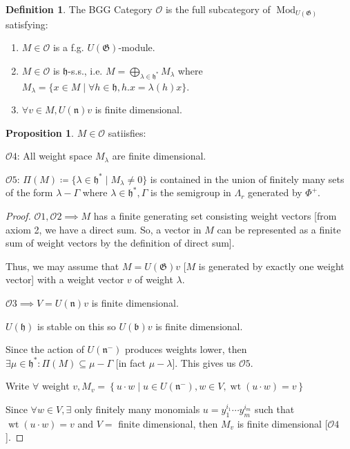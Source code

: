 \documentclass{article}
\theoremstyle{definition}
\newtheorem*{definition}{Definition}
\newtheorem{proposition}[theorem]{Proposition}
\begin{document}
    \begin{definition}
        The BGG Category \(\mathcal{O}\) is the full subcategory of \(\operatorname{Mod}_{U(\mathfrak{G})}\) satisfying:

        \begin{enumerate}[label=$\mathcal{O}$\arabic*)]
            \item \(M\in \mathcal{O}\) is a f.g. \(U(\mathfrak{G})\)-module.
            \item \(M \in \mathcal{O}\) is \(\mathfrak{h}\)-s.s., i.e. \(M = \bigoplus_{\lambda \in \mathfrak{h}^{\ast}} M_\lambda\) where \(M_\lambda = \{ x\in M \mid \forall h\in \mathfrak{h}, h . x = \lambda(h)x \}\).
            \item \(\forall v\in M, U(\mathfrak{n})v\) is finite dimensional.  
        \end{enumerate} 
    \end{definition}

    \begin{proposition}
        \(M\in \mathcal{O}\) satiisfies:

        \(\mathcal{O}4\): All weight space \(M_\lambda\) are finite dimensional.

        \(\mathcal{O}5\): \(\Pi(M) \coloneqq \{ \lambda \in \mathfrak{h}^{\ast} \mid M_\lambda \neq 0 \}\) is contained in the union of finitely many sets of the form \(\lambda-\Gamma\) where \(\lambda \in \mathfrak{h}^{\ast}, \Gamma\) is the semigroup in \(\Lambda_r\) generated by \(\Phi^+\).
    \end{proposition}

    \begin{proof}
        \(\mathcal{O} 1, \mathcal{O} 2 \implies M\)  has a finite generating set consisting weight vectors [from axiom 2, we have a direct sum. So, a vector in \(M\) can be represented as a finite sum of weight vectors by the definition of direct sum].

        Thus, we may assume that \(M = U(\mathfrak{G}) v\) [\(M\) is generated by exactly one weight vector] with a weight vector \(v\) of weight \(\lambda\).

        \(\mathcal{O} 3 \implies V = U(\mathfrak{n})v\) is finite dimensional.
        
        \(U(\mathfrak{h})\) is stable on this so \(U(\mathfrak{b})v\) is finite dimensional.
        
        Since the action of \(U(\mathfrak{n}^-)\) produces weights lower, then \(\exists \mu \in \mathfrak{h}^{\ast}: \Pi (M) \subseteq \mu - \Gamma\) [in fact \(\mu - \lambda\)]. This gives us \(\mathcal{O}5\).
        
        Write \(\forall\) weight \(v, M_v = \left\{ u \cdot w \mid u\in U(\mathfrak{n}^-), w\in V, \operatorname{wt}(u \cdot w) = v \right\} \)

        Since \(\forall w\in V, \exists\) only finitely many monomials \(u = y_1^{i_1} \cdots y_m^{i_m}\) such that \(\operatorname{wt}(u \cdot w) = v\) and \(V =\) finite dimensional, then \(M_v\) is finite dimensional [\(\mathcal{O} 4\)].
    \end{proof}
\end{document}
